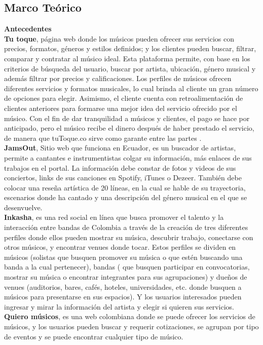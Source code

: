 \subsection{Marco Teórico}
\textbf{Antecedentes}\\
\textbf{Tu toque}, página web donde los músicos pueden ofrecer sus servicios con precios, formatos, géneros y estilos definidos; y los clientes pueden buscar, filtrar, comparar y contratar al músico ideal.
Esta plataforma permite, con base en los criterios de búsqueda del usuario, buscar por artista, ubicación, género musical y además filtrar por precios y calificaciones. Los perfiles de músicos ofrecen diferentes servicios y formatos musicales, lo cual brinda al cliente un gran número de opciones para elegir. Asimismo, el cliente cuenta con retroalimentación de clientes anteriores para formarse una mejor idea del servicio ofrecido por el músico.
Con el fin de dar tranquilidad a músicos y clientes, el pago se hace por anticipado, pero el músico recibe el dinero después de haber prestado el servicio, de manera que tuToque.co sirve como garante entre las partes  . \\

\textbf{JamsOut}, Sitio web que funciona en Ecuador, es un buscador de artistas, permite a cantantes e instrumentistas colgar su información, más enlaces de sus trabajos en el portal.
La información debe constar de fotos y videos de sus conciertos, links de sus canciones en Spotify, iTunes o Dezeer. También debe colocar una reseña artística de 20 líneas, en la cual se hable de su trayectoria, escenarios donde ha cantado y una descripción del género musical en el que se desenvuelve.\\
 
\textbf{Inkasha}, es una red social en línea que busca promover el talento y la interacción entre bandas de Colombia a través de la creación de tres diferentes perfiles donde ellos pueden mostrar su música, descubrir trabajo, conectarse con otros músicos, y encontrar venues donde tocar.
Estos perfiles se dividen en músicos (solistas que busquen promover su música o que estén buscando una banda a la cual pertenecer), bandas ( que busquen participar en convocatorias, mostrar su música o encontrar integrantes para sus agrupaciones) y dueños de venues (auditorios, bares, cafés, hoteles, universidades, etc. donde busquen a músicos para presentarse en sus espacios).
Y los usuarios interesados pueden ingresar y mirar la información del artista y elegir si quieren sus servicios.\\


\textbf{Quiero músicos}, es una web colombiana donde se puede ofrecer los servicios de músicos, y los usuarios pueden buscar y requerir cotizaciones, se agrupan por tipo de eventos y se puede encontrar cualquier tipo de músico. \\
